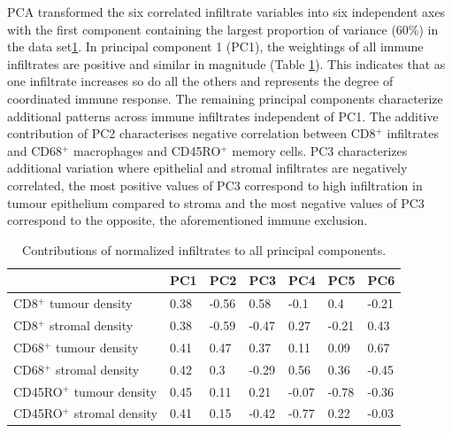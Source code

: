  PCA transformed the six correlated infiltrate variables into six independent axes with the first component containing the largest proportion of variance (60\%) in the data set\ref{tab:PC}. In principal component 1 (PC1), the weightings of all immune infiltrates are positive and similar in magnitude (Table \ref{tab:PC}). This indicates that as one infiltrate increases so do all the others and represents the degree of coordinated immune response. The remaining principal components characterize additional patterns across immune infiltrates independent of PC1. The additive contribution of PC2 characterises negative correlation between CD8$^+$ infiltrates and CD68$^+$ macrophages and CD45RO$^+$ memory cells. PC3 characterizes additional variation where epithelial and stromal infiltrates are negatively correlated, the most positive values of PC3 correspond to high infiltration in tumour epithelium compared to stroma and the most negative values of PC3 correspond to the opposite, the aforementioned immune exclusion. 
 
\begin{table}[]
    \centering
    \begin{tabular}{lllllll}
&PC1& PC2&PC3&PC4&PC5&PC6\\
\hline
CD8$^+$ tumour density& 0.38&-0.56&0.58&-0.1&0.4&-0.21\\
CD8$^+$ stromal density&0.38&-0.59&-0.47&0.27&-0.21&0.43\\
CD68$^+$ tumour density&0.41&0.47&0.37&0.11&0.09&0.67\\
CD68$^+$ stromal density&0.42&0.3&-0.29&0.56&0.36&-0.45\\
CD45RO$^+$ tumour density&0.45&0.11&0.21&-0.07&-0.78&-0.36\\
CD45RO$^+$ stromal density&0.41&0.15&-0.42&-0.77&0.22&-0.03\\
\hline
    \end{tabular}
    \caption{Contributions of normalized infiltrates to all principal components.}
    \label{tab:PC}
\end{table}


